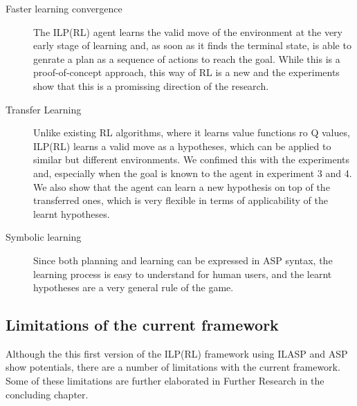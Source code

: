 \begin{description}
\item[Faster learning convergence]
The ILP(RL) agent learns the valid move of the environment at the very early stage of learning and, as soon as it finds the terminal state, is able to genrate a plan as a sequence of actions to reach the goal.
While this is a proof-of-concept approach, this way of RL is a new and the experiments show that this is a promissing direction of the research.

\item[Transfer Learning]
Unlike existing RL algorithms, where it learns value functions ro Q values, ILP(RL) learns a valid move as a hypotheses, which can be applied to similar but different environments.
We confimed this with the experiments and, especially when the goal is known to the agent in experiment 3 and 4.
We also show that the agent can learn a new hypothesis on top of the transferred ones, which is very flexible in terms of applicability of the learnt hypotheses.

\item[Symbolic learning]
Since both planning and learning can be expressed in ASP syntax, the learning process is easy to understand for human users, and the learnt hypotheses are a very general rule of the game.
\end{description} 



\subsection{Limitations of the current framework}
\label{subsec:limitations}
Although the this first version of the ILP(RL) framework using ILASP and ASP show potentials, there are a number of limitations with the current framework.
Some of these limitations are further elaborated in Further Research in the concluding chapter.

